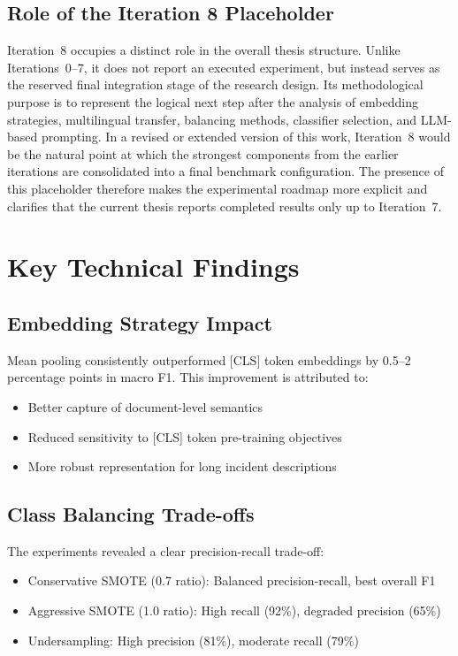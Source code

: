 \documentclass[11pt, titlepage, bibliography=totoc]{scrreprt}
\begin{document}

\subsection{Role of the Iteration 8 Placeholder}

Iteration~8 occupies a distinct role in the overall thesis structure. Unlike Iterations~0--7, it does not report an executed experiment, but instead serves as the reserved final integration stage of the research design. Its methodological purpose is to represent the logical next step after the analysis of embedding strategies, multilingual transfer, balancing methods, classifier selection, and LLM-based prompting. In a revised or extended version of this work, Iteration~8 would be the natural point at which the strongest components from the earlier iterations are consolidated into a final benchmark configuration. The presence of this placeholder therefore makes the experimental roadmap more explicit and clarifies that the current thesis reports completed results only up to Iteration~7.

\section{Key Technical Findings}

\subsection{Embedding Strategy Impact}
Mean pooling consistently outperformed [CLS] token embeddings by 0.5--2 percentage points in macro F1. This improvement is attributed to:
\begin{itemize}
    \item Better capture of document-level semantics
    \item Reduced sensitivity to [CLS] token pre-training objectives
    \item More robust representation for long incident descriptions
\end{itemize}

\subsection{Class Balancing Trade-offs}
The experiments revealed a clear precision-recall trade-off:
\begin{itemize}
    \item Conservative SMOTE (0.7 ratio): Balanced precision-recall, best overall F1
    \item Aggressive SMOTE (1.0 ratio): High recall (92\%), degraded precision (65\%)
    \item Undersampling: High precision (81\%), moderate recall (79\%)
\end{itemize}
\end{document}
